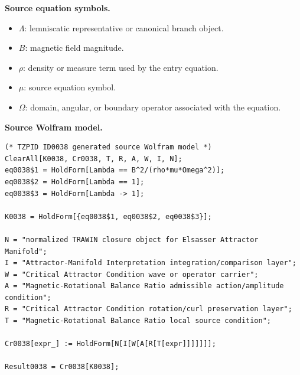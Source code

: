 \begin{minipage}[t]{0.49\linewidth}
\begingroup
\small
\raggedright
\textbf{Source equation symbols.}\par
\begin{itemize}[leftmargin=1.35em,itemsep=1pt,topsep=1pt,parsep=0pt]
    \item $\Lambda$: lemniscatic representative or canonical branch object.
    \item $B$: magnetic field magnitude.
    \item $\rho$: density or measure term used by the entry equation.
    \item $\mu$: source equation symbol.
    \item $\Omega$: domain, angular, or boundary operator associated with the equation.
\end{itemize}
\endgroup
\end{minipage}\hfill
\begin{minipage}[t]{0.47\linewidth}
\begingroup
\scriptsize
\raggedright
\textbf{Source Wolfram model.}\par
\begin{Verbatim}[fontsize=\tiny,breaklines=true,breakanywhere=true]
(* TZPID ID0038 generated source Wolfram model *)
ClearAll[K0038, Cr0038, T, R, A, W, I, N];
eq0038$1 = HoldForm[Lambda == B^2/(rho*mu*Omega^2)];
eq0038$2 = HoldForm[Lambda == 1];
eq0038$3 = HoldForm[Lambda -> 1];

K0038 = HoldForm[{eq0038$1, eq0038$2, eq0038$3}];

N = "normalized TRAWIN closure object for Elsasser Attractor Manifold";
I = "Attractor-Manifold Interpretation integration/comparison layer";
W = "Critical Attractor Condition wave or operator carrier";
A = "Magnetic-Rotational Balance Ratio admissible action/amplitude condition";
R = "Critical Attractor Condition rotation/curl preservation layer";
T = "Magnetic-Rotational Balance Ratio local source condition";

Cr0038[expr_] := HoldForm[N[I[W[A[R[T[expr]]]]]]];

Result0038 = Cr0038[K0038];
\end{Verbatim}
\endgroup
\end{minipage}

